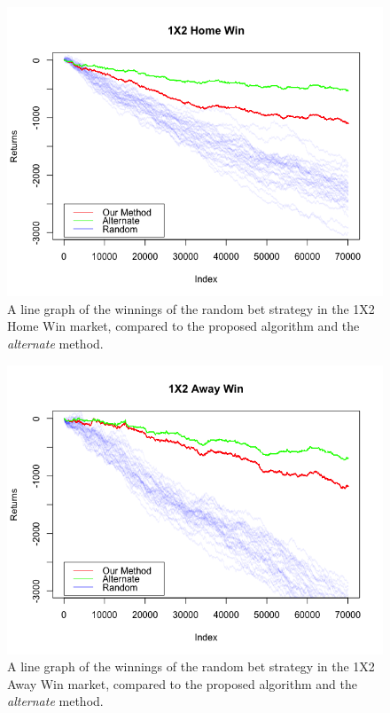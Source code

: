 \documentclass[a4paper,10pt]{report}
\begin{document}
\begin{figure}[h!]\begin{center}
	\includegraphics[width=.65\textwidth]{model_05_1x2H.png}  
	\caption{A line graph of the winnings of the random bet strategy in the 1X2 Home Win market, compared to the proposed algorithm and the \textit{alternate} method.}\label{FIG:03_03_randomstrat_1x2H}
\end{center}\end{figure}
\begin{figure}[h!]\begin{center}
	\includegraphics[width=.65\textwidth]{model_05_1x2A.png}  
	\caption{A line graph of the winnings of the random bet strategy in the 1X2 Away Win market, compared to the proposed algorithm and the \textit{alternate} method.}\label{FIG:03_03_randomstrat_1x2A}
\end{center}\end{figure}

\pagebreak
\end{document}
